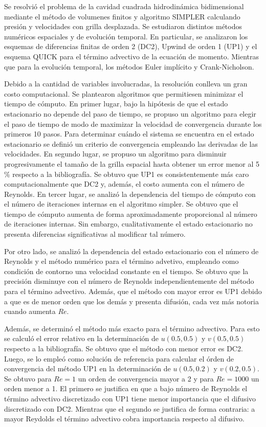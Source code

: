 \documentclass[aps,prb,twocolumn,superscriptaddress,floatfix,longbibliography,10pt]{revtex4-2}
\newcounter{para}
\begin{document}
Se resolvió el problema de la cavidad cuadrada hidrodinámica bidimensional mediante el método de volumenes finitos y algoritmo SIMPLER calculando presión y velocidades con grilla desplazada. Se estudiaron distintos métodos numéricos espaciales y de evolución temporal. En particular, se analizaron los esquemas de diferencias finitas de orden 2 (DC2), Upwind de orden 1 (UP1) y el esquema QUICK  para el término advectivo de la ecuación de momento. Mientras que para la evolución temporal, los métodos Euler implícito y Crank-Nicholson. 

Debido a la cantidad de variables involucradas, la resolución conlleva un gran costo computacional. Se plantearon algoritmos que permitiesen minimizar el tiempo de cómputo. En primer lugar, bajo la hipótesis de que el estado estacionario no depende del paso de tiempo, se propuso un algoritmo para elegir el paso de tiempo de modo de maximizar la velocidad de convergencia durante los primeros 10 pasos. Para determinar cuándo el sistema se encuentra en el estado estacionario se definió un criterio de convergencia empleando las derivadas de las velocidades. En segundo lugar, se propuso un algoritmo para disminuir progresivamente el tamaño de la grilla espacial hasta obtener un error menor al 5 \% respecto a la bibliografía. Se obtuvo que UP1 es consistentemente más caro computacionalmente que DC2 y, además, el costo aumenta con el número de Reynolds. En tercer lugar, se analizó la dependencia del tiempo de cómputo con el número de iteraciones internas en el algoritmo simpler. Se obtuvo que el tiempo de cómputo aumenta de forma aproximadamente proporcional al número de iteraciones internas. Sin embargo, cualitativamente el estado estacionario no presenta diferencias significativas al modificar tal número.


Por otro lado, se analizó la dependencia del estado estacionario con el número de Reynolds y el método numérico para el término advetivo, empleando como condición de contorno una velocidad constante en el tiempo. Se obtuvo que la precisión disminuye con el número de Reynolds independientemente del método para el término advectivo. Además, que el método con mayor error es UP1 debido a que es de menor orden que los demás y presenta difusión, cada vez más notoria cuando aumenta $Re$.

Además, se determinó el método más exacto para el término advectivo. Para esto se calculó el error relativo en la determinación de $u(0.5,0.5)$ y $v(0.5,0.5)$ respecto a la bibliografía. Se obtuvo que el método con menor error es DC2. Luego, se lo empleó como solución de referencia para calcular el órden de convergencia del método UP1 en la determinación de $u(0.5,0.2)$ y $v(0.2,0.5)$. Se obtuvo para $Re = 1$ un orden de convergencia mayor a 2 y para $Re = 1000$ un orden menor a 1. El primero se justifica en que a bajo número de Reynolds el término advectivo discretizado con UP1 tiene menor importancia que el difusivo discretizado con DC2. Mientras que el segundo se justifica de forma contraria: a mayor Reydolds el término advectivo cobra importancia respecto al difusivo.
\end{document}
